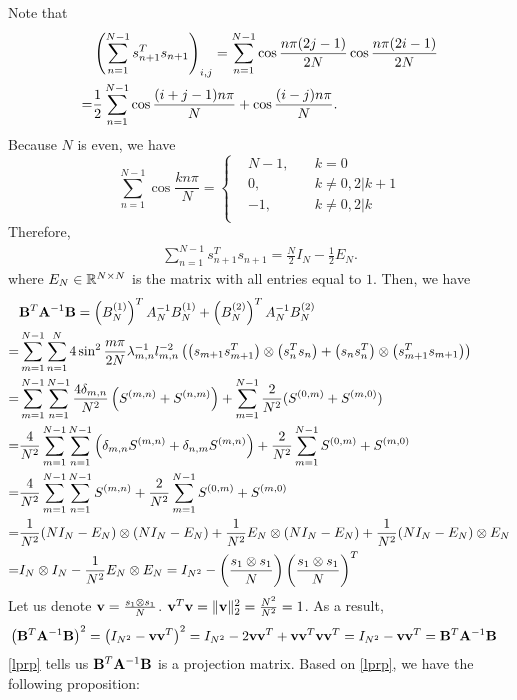 \documentclass[english]{pkupaper}
\newenvironment{eqt}{\begin{equation}\begin{aligned}}{\end{aligned}\end{equation}}
\begin{document}
Note that 
\begin{eqt}
&\lp\sum_{n=1}^{N-1}s_{n+1}^T s_{n+1} \rp_{i,j}=\sum_{n=1}^{N-1} \cos\frac{n\pi(2j-1)}{2N}\cos\frac{n\pi(2i-1)}{2N}\\
=&\frac{1}{2}\sum_{n=1}^{N-1}\cos\frac{(i+j-1)n\pi}{N}+\cos\frac{(i-j)n\pi}{N}.
\end{eqt}
Because $N$ is even, we have
\begin{equation}
\sum_{n=1}^{N-1}\cos\frac{kn\pi}{N}=\left\{\begin{aligned}
&N-1, \quad &k=0\\
&0, & k\neq 0 , 2|k+1\\
&-1, & k\neq 0 , 2|k\\
\end{aligned}\right.
\end{equation} 
Therefore, 
\begin{eqt}\sum_{n=1}^{N-1}s_{n+1}^T s_{n+1}=\frac{N}{2}I_N-\frac{1}{2}E_N.
\end{eqt}
where $E_N\in \mathbb{R}^{N\times N}$ is the matrix with all entries equal to $1$. Then, we have
\begin{eqt}
&\mfB^T\mfA^{-1}\mfB=\lp B_N^{(1)}\rp^TA_N^{-1}B_N^{(1)}+\lp B_N^{(2)}\rp^TA_N^{-1}B_N^{(2)}\\
=&\sum_{m=1}^{N-1}\sum_{n=1}^{N}4\sin^2\frac{m\pi}{2N}\lambda_{m,n}^{-1}l_{m,n}^{-2}\lp\lp s_{m+1}s_{m+1}^T\rp\otimes \lp s_n^T s_n \rp+\lp s_{n}s_{n}^T\rp\otimes \lp s_{m+1}^T s_{m+1} \rp\rp \\
=&\sum_{m=1}^{N-1}\sum_{n=1}^{N-1}\frac{4\delta_{m,n}}{N^2}\lp S^{(m,n)}+S^{(n,m)}\rp+\sum_{m=1}^{N-1}\frac{2}{N^2}(S^{(0,m)}+S^{(m,0)})\\ 
=&\frac{4}{N^2}\sum_{m=1}^{N-1}\sum_{n=1}^{N-1}\lp \delta_{m,n}S^{(m,n)}+\delta_{n,m}S^{(m,n)}\rp+\frac{2}{N^2}\sum_{m=1}^{N-1}S^{(0,m)}+S^{(m,0)}\\
=&\frac{4}{N^2}\sum_{m=1}^{N-1}\sum_{n=1}^{N-1}S^{(m,n)}+\frac{2}{N^2}\sum_{m=1}^{N-1}S^{(0,m)}+S^{(m,0)}\\
=&\frac{1}{N^2}(NI_N-E_N)\otimes(NI_N-E_N)+\frac{1}{N^2}E_N\otimes (NI_N-E_N)+\frac{1}{N^2}(NI_N-E_N)\otimes E_N\\
=&I_N\otimes I_N-\frac{1}{N^2}E_N\otimes E_N=I_{N^2}-\lp\frac{s_1\otimes s_1}{N}\rp\lp\frac{s_1\otimes s_1}{N}\rp^T
\end{eqt}
Let us denote $\mathbf{v}=\frac{s_1\otimes s_1}{N}$. $\mathbf{v}^T\mathbf{v}=\|\mathbf{v}\|_2^2=\frac{N^2}{N^2}=1$. As a result, 
\begin{eqt}
\label{lprp}
&\lp\mfB^T\mfA^{-1}\mfB\rp^2 = \lp I_{N^2}-\mfv\mfv^T\rp^2=I_{N^2}-2\mfv\mfv^T+\mfv\mfv^T\mfv\mfv^T=I_{N^2}-\mfv\mfv^T=\mfB^T\mfA^{-1}\mfB
\end{eqt}
\ref{lprp} tells us $\mathbf{B}^T\mathbf{A}^{-1}\mathbf{B}$ is a projection matrix. Based on \ref{lprp}, we have the following proposition: 
\end{document}
